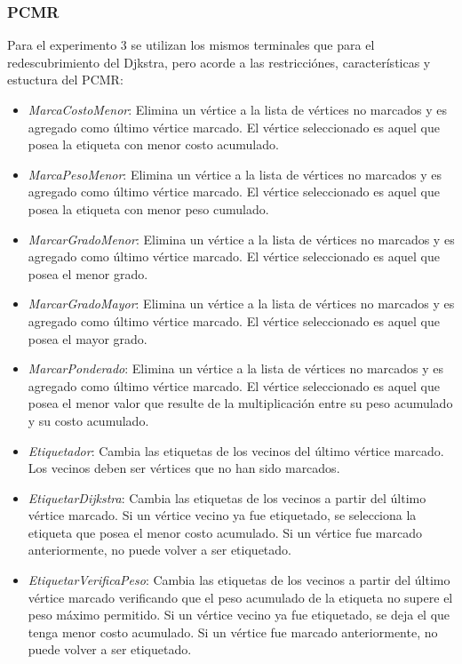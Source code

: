 \subsubsection*{PCMR}

Para el experimento 3 se utilizan los mismos terminales que para el redescubrimiento del Djkstra, pero acorde a las restricciónes, características y estuctura del PCMR:

\begin{itemize}

\item \textit{MarcaCostoMenor}: Elimina un vértice a la lista de vértices no marcados y es agregado como último vértice marcado. El vértice seleccionado es aquel que posea la etiqueta con menor costo acumulado.

\item \textit{MarcaPesoMenor}: Elimina un vértice a la lista de vértices no marcados y es agregado como último vértice marcado. El vértice seleccionado es aquel que posea la etiqueta con menor peso cumulado. 

\item \textit{MarcarGradoMenor}: Elimina un vértice a la lista de vértices no marcados y es agregado como último vértice marcado. El vértice seleccionado es aquel que posea el menor grado.

\item \textit{MarcarGradoMayor}: Elimina un vértice a la lista de vértices no marcados y es agregado como último vértice marcado. El vértice seleccionado es aquel que posea el mayor grado.

\item \textit{MarcarPonderado}: Elimina un vértice a la lista de vértices no marcados y es agregado como último vértice marcado. El vértice seleccionado es aquel que posea el menor valor que resulte de la multiplicación entre su peso acumulado y su costo acumulado. 

\item \textit{Etiquetador}: Cambia las etiquetas de los vecinos del último vértice marcado. Los vecinos deben ser vértices que no han sido marcados.

\item \textit{EtiquetarDijkstra}: Cambia las etiquetas de los vecinos a partir del último vértice marcado. Si un vértice vecino ya fue etiquetado, se selecciona la etiqueta que posea el menor costo acumulado. Si un vértice fue marcado anteriormente, no puede volver a ser etiquetado.

\item \textit{EtiquetarVerificaPeso}: Cambia las etiquetas de los vecinos a partir del último vértice marcado verificando que el peso acumulado de la etiqueta no supere el peso máximo permitido. Si un vértice vecino ya fue etiquetado, se deja el que tenga menor costo acumulado. Si un vértice fue marcado anteriormente, no puede volver a ser etiquetado.

\end{itemize}

